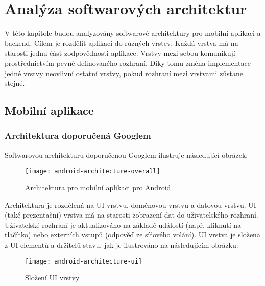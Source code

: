 \chapter{Analýza softwarových architektur}
\setcounter{page}{1}

V této kapitole budou analyzovány softwarové architektury pro mobilní aplikaci a backend. Cílem je rozdělit aplikaci do různých vrstev. Každá vrstva má na starosti jednu část zodpovědnosti aplikace. Vrstvy mezi sebou komunikují prostřednictvím pevně definovaného rozhraní. Díky tomu změna implementace jedné vrstvy neovlivní ostatní vrstvy, pokud rozhraní mezi vrstvami zůstane stejné.

\section{Mobilní aplikace}

\subsection{Architektura doporučená Googlem}
\label{subsec:architecture-google}
Softwarovou architekturu doporučenou Googlem \cite{android-architecture} ilustruje následující obrázek:

\begin{figure}[h!]
	\centering
	
	\texttt{[image: android-architecture-overall]}
	
	\caption{Architektura pro mobilní aplikaci pro Android \cite{android-architecture}}
	\label{fig:android-architecture-overall}
\end{figure}

\noindent Architektura je rozdělená na UI vrstvu, doménovou vrstvu a datovou vrstvu. UI (také prezentační) vrstva má na starosti zobrazení dat do uživatelského rozhraní. Uživatelské rozhraní je aktualizováno na základě událostí (např. kliknutí na tlačítko) nebo externích vstupů (odpověď ze síťového volání). UI vrstva je složena z UI elementů a držitelů stavu, jak je ilustrováno na následujícím obrázku:

\begin{figure}[H]
	\centering
	
	\texttt{[image: android-architecture-ui]}
	
	\caption{Složení UI vrstvy \cite{android-architecture}}
	\label{fig:android-architecture-ui}
\end{figure}

